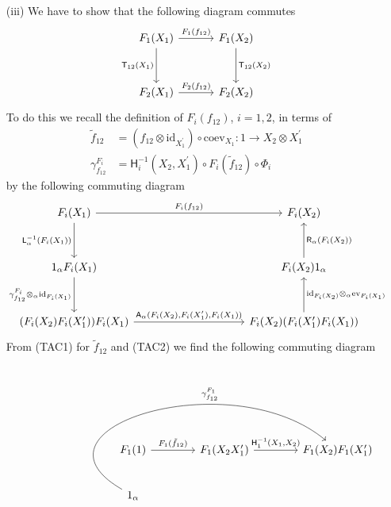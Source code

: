 \begin{prf}
\begin{enumerate}
\item[(iii)]
We have to show that the following diagram commutes
\begin{equation*}
\begin{tikzcd}[row sep=3.2em,column sep=3.2em]
  F_{1}(X_{1})
  \ar{r}{F_{1}(f_{12})}
  \ar{d}[swap]{\mathsf{T}_{12}(X_{1})}
  &
  F_{1}(X_{2})
  \ar{d}{\mathsf{T}_{12}(X_{2})}
  \\
  F_{2}(X_{1})
  \ar{r}{F_{2}(f_{12})}
  &
  F_{2}(X_{2})
\end{tikzcd}
\end{equation*}
To do this we recall the definition of $F_{i}(f_{12})$, $i = 1,2$, in terms of
\begin{align*}
  \tilde{f}_{12}
  &=
  \left(
    f_{12}
    \otimes
    \mathrm{id}_{X_{1}^{\prime}}
  \right)
  \circ
  \mathrm{coev}_{X_{1}}
  \colon
  1
  \to
  X_{2} \otimes X_{1}^{\prime}
  \\
  \gamma_{f_{12}}^{F_{i}}
  &=
  \mathsf{H}_{i}^{-1}(X_{2},X_{1}^{\prime})
  \circ
  F_{i}(\tilde{f}_{12})
  \circ
  \Phi_{i}
\end{align*}
by the following commuting diagram
\begin{equation*}
\begin{tikzcd}[row sep=3.2em,column sep=10em]
  F_{i}(X_{1})
  \ar{r}{F_{i}(f_{12})}
  \ar{d}[swap]{\mathsf{L}_{\alpha}^{-1}(F_{i}(X_{1}))}
  &
  F_{i}(X_{2})
  \\
  1_{\alpha} F_{i}(X_{1})
  \ar{d}[swap]{\gamma_{f_{12}}^{F_{i}} \otimes_{\alpha} \mathrm{id}_{F_{i}(X_{1})}}
  &
  F_{i}(X_{2}) 1_{\alpha}
  \ar{u}[swap]{\mathsf{R}_{\alpha}(F_{i}(X_{2}))}
  \\
  (F_{i}(X_{2}) F_{i}(X_{1}^{\prime})) F_{i}(X_{1})
  \ar{r}{\mathsf{A}_{\alpha}(F_{i}(X_{2}),F_{i}(X_{1}^{\prime}),F_{i}(X_{1}))}
  &
  F_{i}(X_{2}) (F_{i}(X_{1}^{\prime}) F_{i}(X_{1}))
  \ar{u}[swap]{\mathrm{id}_{F_{i}(X_{2})} \otimes_{\alpha} \mathrm{ev}_{F_{i}(X_{1})}}
\end{tikzcd}
\end{equation*}
From (TAC1) for $\tilde{f}_{12}$ and (TAC2) we find the following commuting diagram
\begin{equation*}
\begin{tikzcd}[row sep=2.5em,column sep=4em]
  F_{1}(1)
  \ar{r}{F_{1}(\tilde{f}_{12})}
  &
  F_{1}(X_{2} X_{1}^{\prime})
  \arrow{r}{\mathsf{H}_{1}^{-1}(X_{1},X_{2})}
  &
  F_{1}(X_{2}) F_{1}(X_{1}^{\prime})
  \\
  1_{\alpha}
  \ar[out=150,in=140,looseness=1.5]{rru}[xshift=2.3cm,yshift=3mm]{\gamma_{f_{12}}^{F_{1}}}

\end{tikzcd}
\end{equation*}
\end{enumerate}
\end{prf}
